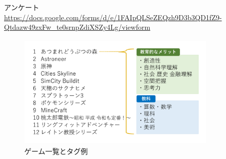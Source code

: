 \documentclass[twocolumn,10pt,a4j]{ltjsarticle}
\begin{document}
アンケート　\url{https://docs.google.com/forms/d/e/1FAIpQLSeZEQzh9D3b3QD1fZ9-Qtdazw49zxFw_te0srnpZdiXSZy4Lg/viewform}


\vspace{1zh}
\begin{figure}[h]
\begin{center}
 \includegraphics[clip,width=95mm,height=55mm]{games.pdf}
\end{center}
 \caption{ゲーム一覧とタグ例}
 \label{fig:スクショ}
\end{figure}



\end{document}
